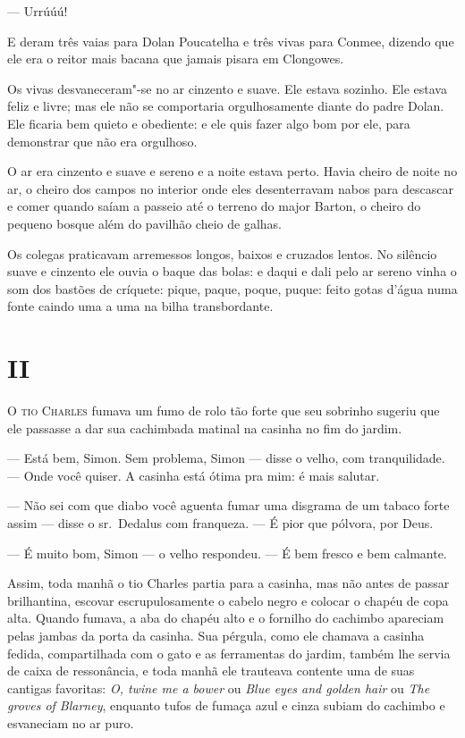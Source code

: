  --- Urrúúú!

E deram três vaias para Dolan Poucatelha e três vivas para Conmee,
dizendo que ele era o reitor mais bacana que jamais pisara em
Clongowes.

Os vivas desvaneceram"-se no ar cinzento e suave. Ele estava sozinho. Ele
estava feliz e livre; mas ele não se comportaria orgulhosamente diante
do padre Dolan. Ele ficaria bem quieto e obediente: e ele quis fazer
algo bom por ele, para demonstrar que não era orgulhoso.

O ar era cinzento e suave e sereno e a noite estava perto. Havia cheiro
de noite no ar, o cheiro dos campos no interior onde eles desenterravam
nabos para descascar e comer quando saíam a passeio até o terreno do
major Barton, o cheiro do pequeno bosque além do pavilhão cheio de
galhas.

Os colegas praticavam arremessos longos, baixos e cruzados lentos. No
silêncio suave e cinzento ele ouvia o baque das bolas: e daqui e dali
pelo ar sereno vinha o som dos bastões de críquete: pique, paque,
poque, puque: feito gotas d’água numa fonte caindo uma a uma na bilha
transbordante.


\chapter{II}

\textsc{O tio Charles} fumava um fumo de rolo tão forte que seu sobrinho sugeriu
que ele passasse a dar sua cachimbada matinal na casinha no fim do
jardim.

 --- Está bem, Simon. Sem problema, Simon --- disse o velho, com
tranquilidade. --- Onde você quiser. A casinha está ótima pra mim: é mais
salutar.

--- Não sei com que diabo você aguenta fumar uma disgrama de um tabaco forte
assim --- disse o sr.~Dedalus com franqueza. --- É pior que pólvora, por Deus.

 --- É muito bom, Simon --- o velho respondeu. --- É bem fresco e bem calmante.

Assim, toda manhã o tio Charles partia para a casinha, mas não antes de
passar brilhantina, escovar escrupulosamente o cabelo negro e colocar o
chapéu de copa alta. Quando fumava, a aba do chapéu alto e o fornilho
do cachimbo apareciam pelas jambas da porta da casinha. Sua pérgula,
como ele chamava a casinha fedida, compartilhada com o gato e as
ferramentas do jardim, também lhe servia de caixa de ressonância, e
toda manhã ele trauteava contente uma de suas cantigas favoritas:
\textit{O, twine me a bower} ou \textit{Blue eyes and golden hair} ou
\textit{The groves of Blarney}, enquanto tufos de fumaça azul e cinza
subiam do cachimbo e esvaneciam no ar puro.


